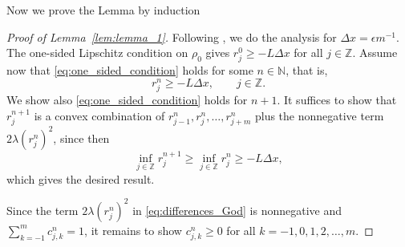 Now we prove the Lemma by induction
\begin{proof}[Proof of Lemma~\ref{lem:lemma_1}]
    Following \cite{huangAsymptoticCompatibilityClass2024}, we do the analysis for $\Delta x = \epsilon m^{-1}$. The one-sided Lipschitz condition on $\rho_0$ gives $r_j^0 \geq - L\Delta x$ for all $j\in \mathbb{Z}$. Assume now that \eqref{eq:one_sided_condition} holds for some $n \in \mathbb{N}$, that is,
    \[
        r_j^n \geq - L\Delta x,  \qquad j \in \mathbb{Z}.
    \]
    We show also \eqref{eq:one_sided_condition} holds for $n+1$. It suffices to show that $r_j^{n+1}$ is a convex combination of $r_{j-1}^n, r_{j}^n,\dots,r_{j+m}^n$ plus the nonnegative term $2\lambda(r_j^n)^2$, since then
    \[
        \inf\limits_{j \in \mathbb{Z}} r_j^{n+1} \geq \inf\limits_{j \in \mathbb{Z}} r_j^{n} \geq -L\Delta x,
    \]
    which gives the desired result.

    Since the term $2\lambda(r_j^n)^2$ in \eqref{eq:differences_God} is nonnegative and $\sum_{k=-1}^m c_{j,k}^n = 1$, it remains to show $c_{j,k}^n  \geq 0 $ for all  $k= -1,0,1,2,\dots,m$.


\end{proof}
